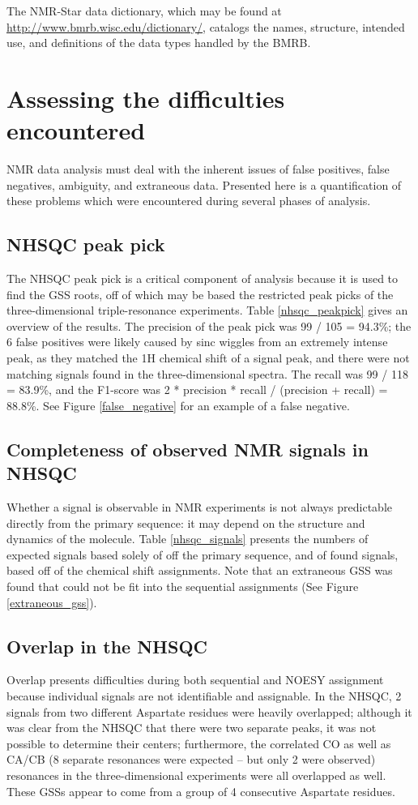 The NMR-Star data dictionary, which may be found at 
\url{http://www.bmrb.wisc.edu/dictionary/}, catalogs the names, structure,
intended use, and definitions of the data types handled by the BMRB.


\section{Assessing the difficulties encountered}
NMR data analysis must deal with the inherent issues of false positives, false 
negatives, ambiguity, and extraneous data.
Presented here is a quantification of these problems which were encountered
during several phases of analysis.

\subsection*{NHSQC peak pick}
The NHSQC peak pick is a critical component of analysis because it is used
to find the GSS roots, off of which may be based the restricted peak picks of
the three-dimensional triple-resonance experiments.
Table \ref{nhsqc_peakpick} gives an overview of the results.
The precision of the peak pick was 99 / 105 = 94.3\%{}; the 6 false positives 
were likely caused by sinc wiggles from an extremely intense peak, as they
matched the 1H chemical shift of a signal peak, and there were not matching
signals found in the three-dimensional spectra.
The recall was 99 / 118 = 83.9\%{}, and the 
F1-score was 2 * precision * recall / (precision + recall) = 88.8\%{}.
See Figure \ref{false_negative} for an example of a false negative.

\subsection*{Completeness of observed NMR signals in NHSQC}
Whether a signal is observable in NMR experiments is not always predictable
directly from the primary sequence:  it may depend on the structure and
dynamics of the molecule.  Table \ref{nhsqc_signals} presents the numbers
of expected signals based solely of off the primary sequence, and of found 
signals, based off of the chemical shift assignments.  Note that an 
extraneous GSS was found that could not be fit into the sequential assignments
(See Figure \ref{extraneous_gss}).

\subsection*{Overlap in the NHSQC}
Overlap presents difficulties during both sequential and NOESY assignment
because individual signals are not identifiable and assignable.
In the NHSQC, 2 signals from two different Aspartate residues were heavily
overlapped; although it was clear from the NHSQC that there were two separate
peaks, it was not possible to determine their centers; furthermore, the
correlated CO as well as CA/CB (8 separate resonances were expected -- but 
only 2 were observed) resonances in the three-dimensional experiments were all
overlapped as well.  These GSSs appear to come from a group of 4 consecutive
Aspartate residues.

